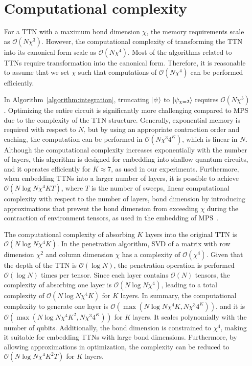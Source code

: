 \documentclass[12pt,dvipdfmx,twoside,openright]{report}
\begin{document}
\section{Computational complexity}
For a TTN with a maximum bond dimension $\chi$, the memory requirements scale as $\mathcal{O}(N\chi^3)$.
However, the computational complexity of transforming the TTN into its canonical form scale as $\mathcal{O}(N\chi^4)$.
Most of the algorithms related to TTNs require transformation into the canonical form.
Therefore, it is reasonable to assume that we set $\chi$ such that computations of $\mathcal{O}(N\chi^4)$ can be performed efficiently.

In Algorithm~\ref{algorithm:integration}, truncating $\ket{\psi}$ to $\ket{\psi_{\chi=2}}$ requires $\mathcal{O}(N\chi^3)$.
Optimizing the entire circuit is significantly more challenging compared to MPS due to the complexity of the TTN structure.
Generally, exponential memory is required with respect to $N$, but by using an appropriate contraction order and caching, the computation can be performed in $\mathcal{O}(N\chi^3 4^K)$, which is linear in $N$.
Although the computational complexity increases exponentially with the number of layers, this algorithm is designed for embedding into shallow quantum circuits, and it operates efficiently for $K \approx 7$, as used in our experiments.
Furthermore, when embedding TTNs into a larger number of layers, it is possible to achieve $\mathcal{O}(N\log{N}\chi^4KT)$, where $T$ is the number of sweeps, linear computational complexity with respect to the number of layers, bond dimension by introducing approximations that prevent the bond dimension from exceeding $\chi$ during the contraction of environment tensors, as used in the embedding of MPS~\cite{mpsdecomp}.

The computational complexity of absorbing $K$ layers into the original TTN is $\mathcal{O}(N\log{N}\chi^4K)$.
In the penetration algorithm, SVD of a matrix with row dimension $\chi^2$ and column dimension $\chi$ has a complexity of $\mathcal{O}(\chi^4)$.
Given that the depth of the TTN is $\mathcal{O}(\log{N})$, the penetration operation is performed $\mathcal{O}(\log{N})$ times per tensor.
Since each layer contains $\mathcal{O}(N)$ tensors, the complexity of absorbing one layer is $\mathcal{O}(N\log{N}\chi^4)$, leading to a total complexity of $\mathcal{O}(N\log{N}\chi^4K)$ for $K$ layers.
In summary, the computational complexity to generate one layer is $\mathcal{O}(\max (N\log{N}\chi^4 K, N\chi^3 4^K))$, and it is $\mathcal{O}(\max (N\log{N}\chi^4 K^2, N\chi^3 4^K))$ for $K$ layers.
It scales polynomially with the number of qubits.
Additionally, the bond dimension is constrained to $\chi^4$, making it suitable for embedding TTNs with large bond dimensions.
Furthermore, by allowing approximations in optimization, the complexity can be reduced to $\mathcal{O}(N\log{N}\chi^4 K^2T)$ for $K$ layers.
\end{document}
